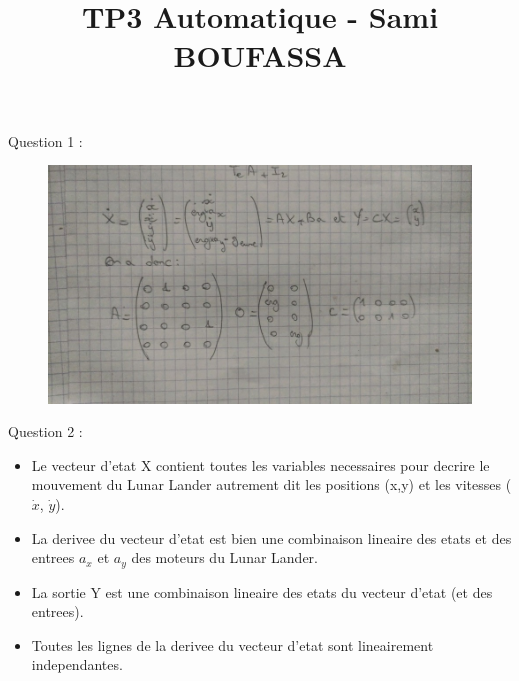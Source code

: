 \documentclass[14pt]{extarticle}
\title{TP3 Automatique - Sami BOUFASSA}
\begin{document}
\maketitle


Question 1 :

\begin{figure}[tbh]
    \vspace{0.1cm}
        \centering
        \includegraphics[width=\columnwidth]{"images/q1.jpg"}
    
    \end{figure}



Question 2 :

\begin{itemize}
    \item Le vecteur d'etat X contient toutes les variables necessaires pour decrire le mouvement du Lunar Lander autrement dit les positions (x,y) et les vitesses ($\dot x$, $\dot y$). 
    \item La derivee du vecteur d'etat est bien une combinaison lineaire des etats et des entrees $a_x$ et $a_y$ des moteurs du Lunar Lander.
    \item La sortie Y est une combinaison lineaire des etats du vecteur d'etat (et des entrees). 
    \item Toutes les lignes de la derivee du vecteur d'etat sont lineairement independantes. 
\end{itemize}
\end{document}
